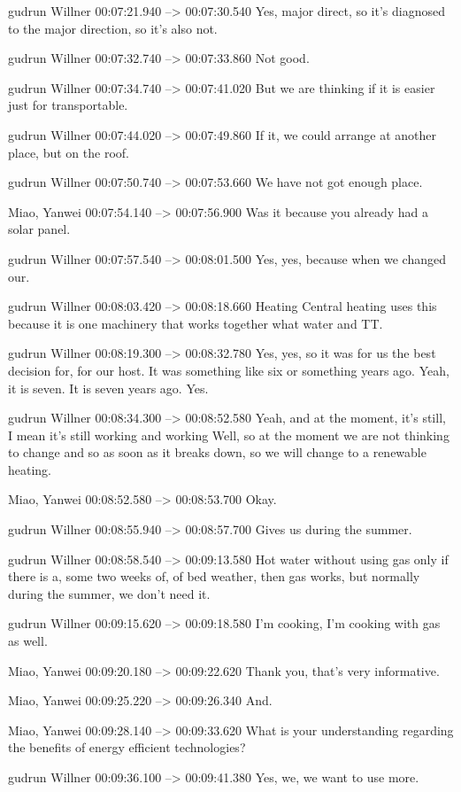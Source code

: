 {gudrun Willner 00:07:21.940 --> 00:07:30.540
Yes, major direct, so it's diagnosed to the major direction, so it's also not.

gudrun Willner 00:07:32.740 --> 00:07:33.860
Not good.

gudrun Willner 00:07:34.740 --> 00:07:41.020
But we are thinking if it is easier just for transportable.

gudrun Willner 00:07:44.020 --> 00:07:49.860
If it, we could arrange at another place, but on the roof.

gudrun Willner 00:07:50.740 --> 00:07:53.660
We have not got enough place.

Miao, Yanwei 00:07:54.140 --> 00:07:56.900
Was it because you already had a solar panel.

gudrun Willner 00:07:57.540 --> 00:08:01.500
Yes, yes, because when we changed our.

gudrun Willner 00:08:03.420 --> 00:08:18.660
Heating Central heating uses this because it is one machinery that works together what water and TT.

gudrun Willner 00:08:19.300 --> 00:08:32.780
Yes, yes, so it was for us the best decision for, for our host. It was something like six or something years ago. Yeah, it is seven. It is seven years ago. Yes.

gudrun Willner 00:08:34.300 --> 00:08:52.580
Yeah, and at the moment, it's still, I mean it's still working and working Well, so at the moment we are not thinking to change and so as soon as it breaks down, so we will change to a renewable heating.

Miao, Yanwei 00:08:52.580 --> 00:08:53.700
Okay.

gudrun Willner 00:08:55.940 --> 00:08:57.700
Gives us during the summer.

gudrun Willner 00:08:58.540 --> 00:09:13.580
Hot water without using gas only if there is a, some two weeks of, of bed weather, then gas works, but normally during the summer, we don't need it.

gudrun Willner 00:09:15.620 --> 00:09:18.580
I'm cooking, I'm cooking with gas as well.

Miao, Yanwei 00:09:20.180 --> 00:09:22.620
Thank you, that's very informative.

Miao, Yanwei 00:09:25.220 --> 00:09:26.340
And.

Miao, Yanwei 00:09:28.140 --> 00:09:33.620
What is your understanding regarding the benefits of energy efficient technologies?

gudrun Willner 00:09:36.100 --> 00:09:41.380
Yes, we, we want to use more.

}
